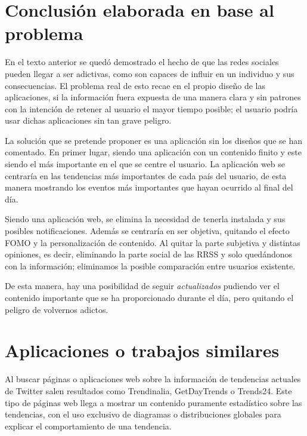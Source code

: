 \section{Conclusión elaborada en base al problema}

En el texto anterior se quedó demostrado el hecho de que las redes sociales pueden llegar a ser adictivas, como son capaces de influir en un individuo y sus consecuencias. El problema real de esto recae en el propio diseño de las aplicaciones, 
si la información fuera expuesta de una manera clara y sin patrones con la intención de retener al usuario el mayor tiempo posible; el usuario podría usar dichas aplicaciones sin tan grave peligro.

\vspace{0.3cm}

La solución que se pretende proponer es una aplicación sin los diseños que se han comentado. En primer lugar, siendo una aplicación con un contenido finito y este siendo el más importante en el que se centre el usuario. La aplicación web se centraría en las tendencias más importantes de cada país del usuario, de esta manera mostrando los eventos más importantes que hayan ocurrido al final del día.

\vspace{0.3cm}

Siendo una aplicación web, se elimina la necesidad de tenerla instalada y sus posibles notificaciones. Además se centraría en ser objetiva, quitando el efecto \acs{FOMO} y la personalización de contenido. Al quitar la parte subjetiva y distintas opiniones, es decir, eliminando la parte social de las \acs{RRSS} y solo quedándonos con la información; eliminamos la posible comparación entre usuarios existente.

\vspace{0.3cm}

De esta manera, hay una posibilidad de seguir \textit{actualizados} pudiendo ver el contenido importante que se ha proporcionado durante el día, pero quitando el peligro de volvernos adictos.

\section{Aplicaciones o trabajos similares}
Al buscar páginas o aplicaciones web sobre la información de tendencias actuales de Twitter salen resultados como Trendinalia, GetDayTrends o Trends24. Este tipo de páginas web llega a mostrar un contenido puramente estadístico sobre las tendencias, con el uso exclusivo de diagramas o distribuciones globales para explicar el comportamiento de una tendencia.

